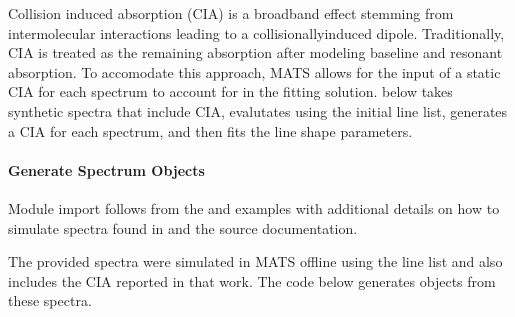 \documentclass[letterpaper,10pt,english]{sphinxmanual}
\begin{document}
\sphinxAtStartPar
Collision induced absorption (CIA) is a broadband effect stemming from intermolecular interactions leading to a collisionally\sphinxhyphen{}induced dipole. Traditionally, CIA is treated as the remaining absorption after modeling baseline and resonant absorption. To accomodate this approach, MATS allows for the input of a static CIA for each spectrum to account for in the fitting solution.  below takes synthetic spectra that include CIA, evalutates using the initial line list, generates a CIA for each spectrum, and then fits the line shape parameters.


\paragraph{Generate Spectrum Objects}
\label{\detokenize{Incorporating CIA into fits:generate-spectrum-objects}}
\sphinxAtStartPar
Module import follows from the {\hyperref[\detokenize{Fitting Experimental Spectra:fitting-experimental-spectra}]{}} and {\hyperref[\detokenize{Fitting Synthetic Spectra:fitting-synthetic-spectra}]{}} examples with additional details on how to simulate spectra found in {\hyperref[\detokenize{Fitting Synthetic Spectra:fitting-synthetic-spectra}]{}} and the source documentation.

\sphinxAtStartPar
The provided spectra were simulated in MATS offline using the  line list and also includes the CIA reported in that work. The code below generates {\hyperref[\detokenize{MATS:MATS.spectrum.Spectrum}]{}} objects from these spectra.
\end{document}
